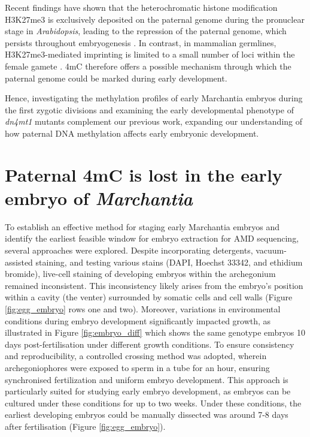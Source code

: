 Recent findings have shown that the heterochromatic histone modification H3K27me3 is exclusively deposited on the paternal genome during the pronuclear stage in \textit{Arabidopsis}, leading to the repression of the paternal genome, which persists throughout embryogenesis \citep{RN160}. In contrast, in mammalian germlines, H3K27me3-mediated imprinting is limited to a small number of loci within the female gamete \citep{RN172}. 4mC therefore offers a possible mechanism through which the paternal genome could be marked during early development.

Hence, investigating the methylation profiles of early Marchantia embryos during the first zygotic divisions and examining the early developmental phenotype of \textit{dn4mt1} mutants complement our previous work, expanding our understanding of how paternal DNA methylation affects early embryonic development.

\clearpage

\section{Paternal 4mC is lost in the early embryo of \textit{Marchantia}}

To establish an effective method for staging early Marchantia embryos and identify the earliest feasible window for embryo extraction for AMD sequencing, several approaches were explored. Despite incorporating detergents, vacuum-assisted staining, and testing various stains (DAPI, Hoechst 33342, and ethidium bromide), live-cell staining of developing embryos within the archegonium remained inconsistent. This inconsistency likely arises from the embryo's position within a cavity (the venter) surrounded by somatic cells and cell walls (Figure \ref{fig:egg_embryo} rows one and two). Moreover, variations in environmental conditions during embryo development significantly impacted growth, as illustrated in Figure \ref{fig:embryo_diff} which shows the same genotype embryos 10 days post-fertilisation under different growth conditions. To ensure consistency and reproducibility, a controlled crossing method was adopted, wherein archegoniophores were exposed to sperm in a tube for an hour, ensuring synchronised fertilization and uniform embryo development. This approach is particularly suited for studying early embryo development, as embryos can be cultured under these conditions for up to two weeks\citep{RN139}. Under these conditions, the earliest developing embryos could be manually dissected was around 7-8 days after fertilisation (Figure \ref{fig:egg_embryo}).

